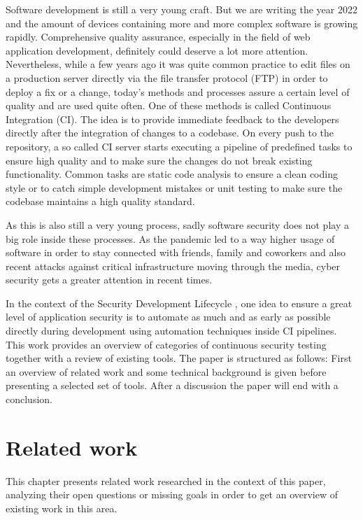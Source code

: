 \documentclass[conference]{IEEEtran}
\begin{document}
Software development is still a very young craft. But we are writing the year 2022 and the amount of devices containing more and more complex software is growing rapidly. Comprehensive quality assurance, especially in the field of web application development, definitely could deserve a lot more attention. Nevertheless, while a few years ago it was quite common practice to edit files on a production server directly via the file transfer protocol (FTP) in order to deploy a fix or a change, today's methods and processes assure a certain level of quality and are used quite often. One of these methods is called Continuous Integration (CI). The idea is to provide immediate feedback to the developers directly after the integration of changes to a codebase. On every push to the repository, a so called CI server starts executing a pipeline of predefined tasks to ensure high quality and to make sure the changes do not break existing functionality. Common tasks are static code analysis to ensure a clean coding style or to catch simple development mistakes or unit testing to make sure the codebase maintains a high quality standard.

As this is also still a very young process, sadly software security does not play a big role inside these processes. As the pandemic led to a way higher usage of software in order to stay connected with friends, family and coworkers and also recent attacks against critical infrastructure moving through the media, cyber security gets a greater attention in recent times.

In the context of the Security Development Lifecycle \cite{sdl}, one idea to ensure a great level of application security is to automate as much and as early as possible directly during development using automation techniques inside CI pipelines. This work provides an overview of categories of continuous security testing together with a review of existing tools. The paper is structured as follows: First an overview of related work and some technical background is given before presenting a selected set of tools. After a discussion the paper will end with a conclusion.

\section{Related work}

This chapter presents related work researched in the context of this paper, analyzing their open questions or missing goals in order to get an overview of existing work in this area.\\
\end{document}
